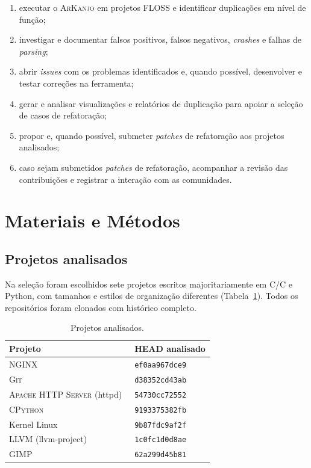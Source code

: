\documentclass{article}
\newcommand{\cpp}{C\nolinebreak\hspace{-.05em}\raisebox{.4ex}{\relsize{-3}{\textbf{+}}}\nolinebreak\hspace{-.10em}\raisebox{.4ex}{\relsize{-3}{\textbf{+}}}}
\newcommand{\ccpp}{C\slash\cpp}
\newcommand{\scene}[2]{\todo[size=\tiny,color=blue!10]{#1 (#2)}}
\newcommand{\ark}{\textsc{ArKanjo}}
\begin{document}
\begingroup
\renewcommand{\labelenumi}{(\alph{enumi})}
\begin{enumerate}
  \item executar o \ark{} em projetos FLOSS e identificar duplicações em nível de função;
  \item investigar e documentar falsos positivos, falsos negativos, \textit{crashes} e falhas de \emph{parsing};
  \item abrir \textit{issues} com os problemas identificados e, quando possível, desenvolver e testar correções na ferramenta;
  \item gerar e analisar visualizações e relatórios de duplicação para apoiar a seleção de casos de refatoração;
  \item propor e, quando possível, submeter \textit{patches} de refatoração aos projetos analisados;
  \item caso sejam submetidos \textit{patches} de refatoração, acompanhar a revisão das contribuições e registrar a interação com as comunidades.
\end{enumerate}
\endgroup

\section{Materiais e Métodos}

\scene{Scene 3}{2:15--4:00}

\subsection{Projetos analisados}

Na seleção foram escolhidos sete projetos escritos majoritariamente em \ccpp{} e Python, com tamanhos e estilos de organização diferentes (Tabela~\ref{tab:projetos}). Todos os repositórios foram clonados com histórico completo.

\begin{table}[ht!]
\centering
\caption{Projetos analisados.}
\label{tab:projetos}
\begin{tabular}{ll}
\toprule
\textbf{Projeto} & \textbf{HEAD analisado} \\
\midrule
\textsc{NGINX}~\cite{nginx} & \texttt{ef0aa967dce9} \\
\textsc{Git}~\cite{git} & \texttt{d38352cd43ab} \\
\textsc{Apache HTTP Server} (httpd)~\cite{apache_httpd} & \texttt{54730cc72552} \\
\textsc{CPython}~\cite{cpython} & \texttt{9193375382fb} \\
Kernel Linux~\cite{linux_kernel} & \texttt{9b87fdc9af2f} \\
\textsc{LLVM} (llvm-project)~\cite{llvm} & \texttt{1c0fc1d0d8ae} \\
\textsc{GIMP}~\cite{gimp} &  \texttt{62a299d45b81} \\
\bottomrule
\end{tabular}
\end{table}
\end{document}
